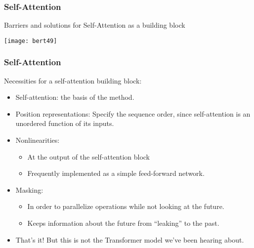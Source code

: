 \begin{frame}[fragile]\frametitle{Self-Attention}

Barriers and solutions for Self-Attention as a building block

\begin{center}
\texttt{[image: bert49]}
\end{center}	

 
\end{frame}

\begin{frame}[fragile]\frametitle{Self-Attention}

Necessities for a self-attention building block:

\begin{itemize}
\item Self-attention:
the basis of the method.
\item Position representations:
Specify the sequence order, since self-attention is an unordered function of its  inputs.
\item Nonlinearities:
\begin{itemize}
\item At the output of the self-attention block
\item Frequently implemented as a simple feed-forward network.
\end{itemize}	 

\item Masking:
\begin{itemize}
\item In order to parallelize operations while not looking at the future.
\item Keeps information about the future from “leaking” to the past.
\end{itemize}	 

\item That’s it! But this is not the Transformer model we’ve been hearing about.


\end{itemize}	 

 
\end{frame}
